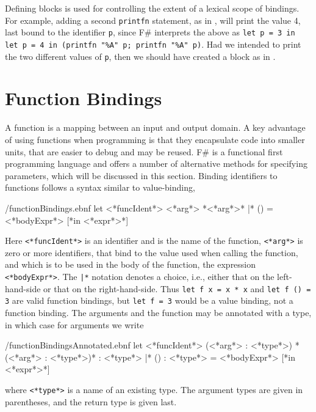 \documentclass[fsharpnotes.tex]{subfiles}
\begin{document}
Defining blocks is used for controlling the extent of a lexical scope of bindings. For example, adding a second \lstinline!printfn! statement, as in ,
will print the value 4, last bound to the identifier \lstinline!p!, since F\# interprets the above as \lstinline!let p = 3 in let p = 4 in (printfn "%A" p; printfn "%A" p)!. %
%
%
Had we intended to print the two different values of \lstinline!p!, then we should have created a block as in .
%
%

\section{Function Bindings}
\label{sec:functions}
A function is a mapping between an input and output domain. A key advantage of using functions when programming is that they encapsulate code into smaller units, that are easier to debug and may be reused. F\# is a functional first programming language and offers a number of alternative methods for specifying parameters, which will be discussed in this section. Binding identifiers to functions follows a syntax similar to value-binding,
%
\begin{verbatimwrite}{\ebnf/functionBindings.ebnf}
let <*funcIdent*> <*arg*> {*<*arg*>*} |* () = <*bodyExpr*> [*in <*expr*>*]
\end{verbatimwrite}
%
Here \lstinline[language=syntax]{<*funcIdent*>} is an identifier and is the name of the function, \lstinline[language=syntax]{<*arg*>} is zero or more identifiers, that bind to the value used when calling the function, and which is to be used in the body of the function, the expression \lstinline[language=syntax]{<*bodyExpr*>}. The \lstinline[language=syntax]{|*} notation denotes a choice, i.e., either that on the left-hand-side or that on the right-hand-side. Thus \lstinline{let f x = x * x} and \lstinline{let f () = 3} are valid function bindings, but \lstinline{let f = 3} would be a value binding, not a function binding. The arguments and the function may be annotated with a type, in which case for arguments we write
%
\begin{verbatimwrite}{\ebnf/functionBindingsAnnotated.ebnf}
let <*funcIdent*> (<*arg*> : <*type*>) {*(<*arg*> : <*type*>)*} : <*type*> |* () : <*type*> = <*bodyExpr*> [*in <*expr*>*]
\end{verbatimwrite}
%
where \lstinline[language=syntax]{<*type*>} is a name of an existing type. The argument types are given in parentheses, and the return type is given last. 
\end{document}
